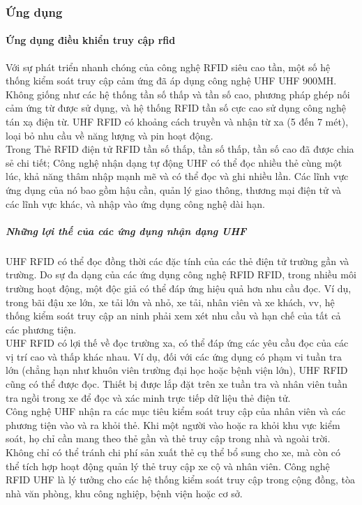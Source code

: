 \subsubsection{Ứng dụng}
\paragraph{Ứng dụng điều khiển truy cập rfid}
Với sự phát triển nhanh chóng của công nghệ RFID siêu cao tần, một số hệ thống kiểm soát truy cập cảm ứng đã áp dụng công nghệ UHF UHF 900MH. Không giống như các hệ thống tần số thấp và tần số cao, phương pháp ghép nối cảm ứng từ được sử dụng, và hệ thống RFID tần số cực cao sử dụng công nghệ tán xạ điện từ. UHF RFID có khoảng cách truyền và nhận từ xa (5 đến 7 mét), loại bỏ nhu cầu về năng lượng và pin hoạt động.\\
Trong Thẻ RFID điện tử RFID tần số thấp, tần số thấp, tần số cao đã được chia sẻ chi tiết; Công nghệ nhận dạng tự động UHF có thể đọc nhiều thẻ cùng một lúc, khả năng thâm nhập mạnh mẽ và có thể đọc và ghi nhiều lần. Các lĩnh vực ứng dụng của nó bao gồm hậu cần, quản lý giao thông, thương mại điện tử và các lĩnh vực khác, và nhập vào ứng dụng công nghệ dài hạn.
\subparagraph{Những lợi thế của các ứng dụng nhận dạng UHF}
UHF RFID có thể đọc đồng thời các đặc tính của các thẻ điện tử trường gần và trường. Do sự đa dạng của các ứng dụng công nghệ RFID RFID, trong nhiều môi trường hoạt động, một độc giả có thể đáp ứng hiệu quả hơn nhu cầu đọc. Ví dụ, trong bãi đậu xe lớn, xe tải lớn và nhỏ, xe tải, nhân viên và xe khách, vv, hệ thống kiểm soát truy cập an ninh phải xem xét nhu cầu và hạn chế của tất cả các phương tiện.\\
UHF RFID có lợi thế về đọc trường xa, có thể đáp ứng các yêu cầu đọc của các vị trí cao và thấp khác nhau. Ví dụ, đối với các ứng dụng có phạm vi tuần tra lớn (chẳng hạn như khuôn viên trường đại học hoặc bệnh viện lớn), UHF RFID cũng có thể được đọc. Thiết bị được lắp đặt trên xe tuần tra và nhân viên tuần tra ngồi trong xe để đọc và xác minh trực tiếp dữ liệu thẻ điện tử.\\
Công nghệ UHF nhận ra các mục tiêu kiểm soát truy cập của nhân viên và các phương tiện vào và ra khỏi thẻ. Khi một người vào hoặc ra khỏi khu vực kiểm soát, họ chỉ cần mang theo thẻ gần và thẻ truy cập trong nhà và ngoài trời. Không chỉ có thể tránh chi phí sản xuất thẻ cụ thể bổ sung cho xe, mà còn có thể tích hợp hoạt động quản lý thẻ truy cập xe cộ và nhân viên. Công nghệ RFID UHF là lý tưởng cho các hệ thống kiểm soát truy cập trong cộng đồng, tòa nhà văn phòng, khu công nghiệp, bệnh viện hoặc cơ sở.
